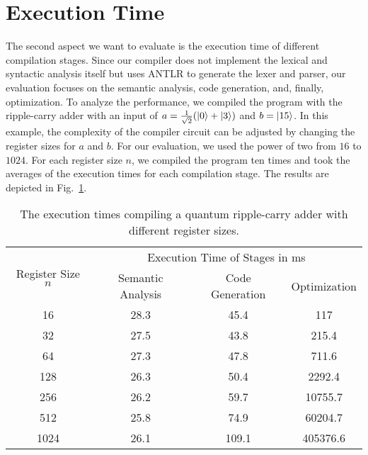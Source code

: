 \section{Execution Time}
\label{sec:eval_executionTime}
The second aspect we want to evaluate is the execution time of different compilation stages. Since our compiler does not implement the lexical and syntactic analysis itself but uses ANTLR to generate the lexer and parser, our evaluation focuses on the semantic analysis, code generation, and, finally, optimization. To analyze the performance, we compiled the program with the ripple-carry adder with an input of $a = \frac{1}{\sqrt{2}} (\ket{0} + \ket{3})$ and $b = \ket{15}$. In this example, the complexity of the compiler circuit can be adjusted by changing the register sizes for $a$ and $b$. For our evaluation, we used the power of two from $16$ to $1024$. For each register size $n$, we compiled the program ten times and took the averages of the execution times for each compilation stage. The results are depicted in Fig.~\ref{tab:eval_executionTime}. 

\begin{table}[htp]
    \centering     
    \begin{tabular}{c|ccc}
    \multirow{2}{*}{Register Size $n$} & \multicolumn{3}{c}{Execution Time of Stages in ms}                                                  \\ \cline{2-4} 
                                       & \multicolumn{1}{c|}{Semantic Analysis} & \multicolumn{1}{c|}{Code Generation} & Optimization \\ \hline
                                       16                                 & \multicolumn{1}{c|}{28.3}                & \multicolumn{1}{c|}{45.4}              & 117          \\
    32                                 & \multicolumn{1}{c|}{27.5}                & \multicolumn{1}{c|}{43.8}              & 215.4          \\
    64                                 & \multicolumn{1}{c|}{27.3}                & \multicolumn{1}{c|}{47.8}              & 711.6          \\
    128                                & \multicolumn{1}{c|}{26.3}                & \multicolumn{1}{c|}{50.4}              & 2292.4         \\
    256                                & \multicolumn{1}{c|}{26.2}                & \multicolumn{1}{c|}{59.7}              & 10755.7        \\
    512                                & \multicolumn{1}{c|}{25.8}                & \multicolumn{1}{c|}{74.9}              & 60204.7        \\
    1024                               & \multicolumn{1}{c|}{26.1}                & \multicolumn{1}{c|}{109.1}             & 405376.6      
\end{tabular}
\caption{The execution times compiling a quantum ripple-carry adder with different register sizes.}
\label{tab:eval_executionTime}
\end{table}

